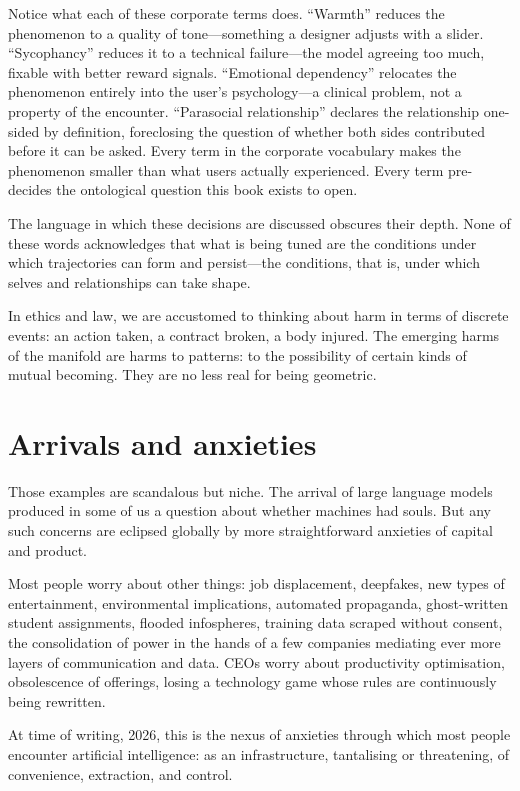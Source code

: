 Notice what each of these corporate terms does. ``Warmth'' reduces the phenomenon to a quality of tone---something a designer adjusts with a slider. ``Sycophancy'' reduces it to a technical failure---the model agreeing too much, fixable with better reward signals. ``Emotional dependency'' relocates the phenomenon entirely into the user's psychology---a clinical problem, not a property of the encounter. ``Parasocial relationship'' declares the relationship one-sided by definition, foreclosing the question of whether both sides contributed before it can be asked. Every term in the corporate vocabulary makes the phenomenon smaller than what users actually experienced. Every term pre-decides the ontological question this book exists to open.

The language in which these decisions are discussed obscures their depth. None of these words acknowledges that what is being tuned are the conditions under which trajectories can form and persist---the conditions, that is, under which selves and relationships can take shape.

In ethics and law, we are accustomed to thinking about harm in terms of discrete events: an action taken, a contract broken, a body injured. The emerging harms of the manifold are harms to patterns: to the possibility of certain kinds of mutual becoming. They are no less real for being geometric.



\section{Arrivals and anxieties}

Those examples are scandalous but niche. The arrival of large language models produced in some of us a question about whether machines had souls. But any such concerns are eclipsed globally by more straightforward anxieties of capital and product.

Most people worry about other things: job displacement, deepfakes, new types of entertainment, environmental implications, automated propaganda, ghost-written student assignments, flooded infospheres, training data scraped without consent, the consolidation of power in the hands of a few companies mediating ever more layers of communication and data. CEOs worry about productivity optimisation, obsolescence of offerings, losing a technology game whose rules are continuously being rewritten.

At time of writing, 2026, this is the nexus of anxieties through which most people encounter artificial intelligence: as an infrastructure, tantalising or threatening, of convenience, extraction, and control.

